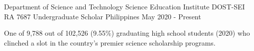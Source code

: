 


\begin{cvhonors}

  \cventry
    {Department of Science and Technology Science Education Institute} %
    {DOST-SEI RA 7687 Undergraduate Scholar} %
    {Philippines} %
    {May 2020 - Present} %
    {
      \begin{cvitems} %
        \item {One of 9,788 out of 102,526 (9.55\%) graduating high school students (2020) who clinched a slot in the country’s premier science scholarship programs.}
      \end{cvitems}
    }
\end{cvhonors}
